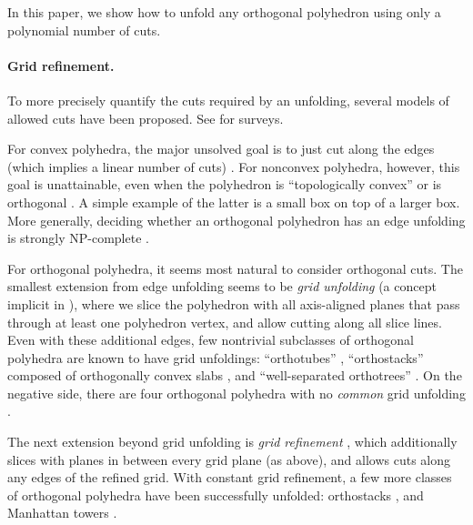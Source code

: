\documentclass[11pt]{article}
\begin{document}
In this paper, we show how to unfold any orthogonal polyhedron
using only a polynomial number of cuts.

\paragraph{Grid refinement.}
To more precisely quantify the cuts required by an unfolding,
several models of allowed cuts have been proposed.
See \cite{Demaine-O'Rourke-2005,Demaine-O'Rourke-2007,O'Rourke-2008-orthosurvey}
for surveys.

For convex polyhedra, the major unsolved goal is to just cut along the edges
(which implies a linear number of cuts) \cite[ch.~22]{Demaine-O'Rourke-2007}.
For nonconvex polyhedra, however, this goal is unattainable, even
when the polyhedron is ``topologically convex''
\cite{Bern-Demaine-Eppstein-Kuo-Mantler-Snoeyink-2003}
or is orthogonal
\cite{Biedl-Demaine-Demaine-Lubiw-Overmars-O'Rourke-Robbins-Whitesides-1998}.
A simple example of the latter is a small box on top of a larger box.
More generally, deciding whether an orthogonal polyhedron has an edge
unfolding is strongly NP-complete \cite{Abel-Demaine-2011}.

For orthogonal polyhedra, it seems most natural to consider orthogonal cuts.
The smallest extension from edge unfolding seems to be \emph{grid unfolding}
(a concept implicit in
\cite{Biedl-Demaine-Demaine-Lubiw-Overmars-O'Rourke-Robbins-Whitesides-1998}),
where we slice the polyhedron with all axis-aligned planes that pass through
at least one polyhedron vertex, and allow cutting along all slice lines.
Even with these additional edges, few nontrivial subclasses of
orthogonal polyhedra are known to have grid unfoldings: ``orthotubes''
\cite{Biedl-Demaine-Demaine-Lubiw-Overmars-O'Rourke-Robbins-Whitesides-1998},
``orthostacks'' composed of orthogonally convex slabs
\cite{Damian-Meijer-2004-orthostacks}, and
``well-separated orthotrees''
\cite{Damian-Flatland-Meijer-O'Rourke-2005-orthotrees}.
On the negative side, there are four orthogonal polyhedra with no
\emph{common} grid unfolding
\cite{Aloupis-Bose-Collette-Demaine-Demaine-Douieb-Dujmovic-Iacono-Langerman-Morin-2010}.

The next extension beyond grid unfolding is \emph{grid refinement} ,
which additionally slices with  planes in between every grid plane
(as above), and allows cuts along any edges of the refined grid.
With constant grid refinement, a few more classes of orthogonal polyhedra
have been successfully unfolded: orthostacks
\cite{Biedl-Demaine-Demaine-Lubiw-Overmars-O'Rourke-Robbins-Whitesides-1998},
and Manhattan towers \cite{Damian-Flatland-O'Rourke-2008-manhattan}.
\end{document}
